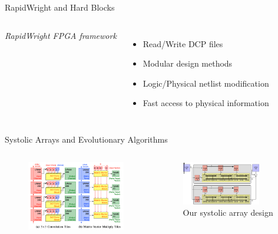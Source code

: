 \documentclass[10pt]{beamer}
\begin{document}
\begin{frame}{RapidWright and Hard Blocks}
\begin{columns}[T, onlytextwidth]
{    \emph{RapidWright FPGA framework}
    \begin{itemize}
      \item Read/Write DCP files 
      \item Modular design methods
      \item Logic/Physical netlist modification
      \item Fast access to physical information
    \end{itemize}
    }
  
\end{columns}

\end{frame}

\begin{frame}{Systolic Arrays and Evolutionary Algorithms}

  \begin{columns}[T, onlytextwidth]
  
    \begin{figure}
      \includegraphics[width=\textwidth]{img/cascade.png}
      \vspace{-0.5cm}
    \end{figure}

    \begin{figure}
      \includegraphics[width=0.8\textwidth]{img/array}
      \caption{Our systolic array design}
    \end{figure}
  

\end{columns}
\end{frame}
\end{document}
